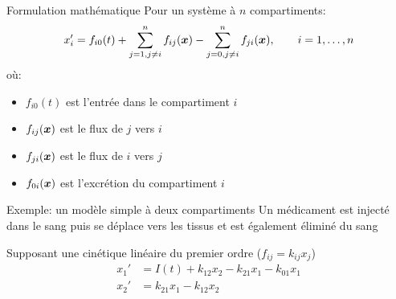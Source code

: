 \documentclass[aspectratio=169]{beamer}\usepackage[]{graphicx}\usepackage[]{xcolor}
\begin{document}
\begin{frame}{Formulation mathématique}
    Pour un système à $n$ compartiments:
    \[
      x_i' = f_{i0}(t) + \sum_{j=1, j\neq i}^{n} f_{ij}(\bm{x}) - \sum_{j=0, j\neq i}^{n} f_{ji}(\bm{x}),\qquad i=1,\ldots,n
    \]
    où:
    \begin{itemize}
        \item $f_{i0}(t)$ est l'entrée dans le compartiment $i$
        \item $f_{ij}(\bm{x})$ est le flux de $j$ vers $i$
        \item $f_{ji}(\bm{x})$ est le flux de $i$ vers $j$
        \item $f_{0i}(\bm{x})$ est l'excrétion du compartiment $i$
    \end{itemize}
\end{frame}

\begin{frame}{Exemple: un modèle simple à deux compartiments}
    Un médicament est injecté dans le sang puis se déplace vers les tissus et est également éliminé du sang

    \begin{center}
    \end{center}

    Supposant une cinétique linéaire du premier ordre ($f_{ij} = k_{ij}x_j$)
    \begin{align*}
        x_1' &= I(t) + k_{12}x_2 - k_{21}x_1 - k_{01}x_1 \\
        x_2' &= k_{21}x_1 - k_{12}x_2
    \end{align*}
\end{frame}
\end{document}
